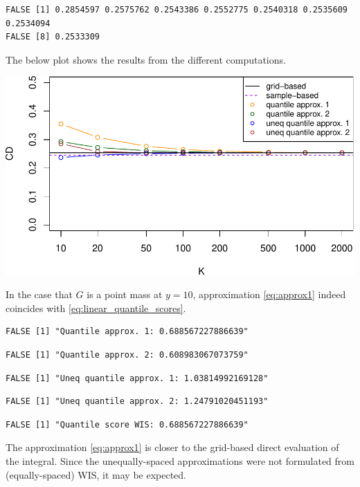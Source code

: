 \documentclass[
]{article}
\begin{document}
\begin{verbatim}
FALSE [1] 0.2854597 0.2575762 0.2543386 0.2552775 0.2540318 0.2535609 0.2534094
FALSE [8] 0.2533309
\end{verbatim}

The below plot shows the results from the different computations.

\begin{center}\includegraphics{cd_approx_2_files/figure-latex/unnamed-chunk-19-1} \end{center}

In the case that \(G\) is a point mass at \(y=10\), approximation
\eqref{eq:approx1} indeed coincides with
\eqref{eq:linear_quantile_scores}.

\begin{verbatim}
FALSE [1] "Quantile approx. 1: 0.688567227886639"
\end{verbatim}

\begin{verbatim}
FALSE [1] "Quantile approx. 2: 0.608983067073759"
\end{verbatim}

\begin{verbatim}
FALSE [1] "Uneq quantile approx. 1: 1.03814992169128"
\end{verbatim}

\begin{verbatim}
FALSE [1] "Uneq quantile approx. 2: 1.24791020451193"
\end{verbatim}

\begin{verbatim}
FALSE [1] "Quantile score WIS: 0.688567227886639"
\end{verbatim}

The approximation \eqref{eq:approx1} is closer to the grid-based direct
evaluation of the integral. Since the unequally-spaced approximations
were not formulated from (equally-spaced) WIS, it may be expected.
\end{document}
